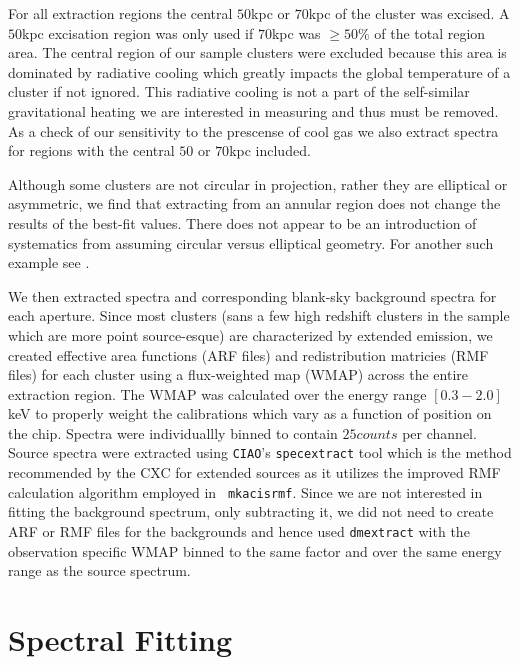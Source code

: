 \documentclass[12pt, preprint]{aastex}
\begin{document}
For all extraction regions the central $50$kpc or
$70$kpc of the cluster was excised. A $50$kpc excisation region was only used if $70$kpc was
$\geq 50\%$ of the total region area. The central region of our sample
clusters were excluded because this area is dominated by radiative cooling which
greatly impacts the global temperature of a cluster if not
ignored. This radiative cooling is not a part of the self-similar
gravitational heating we are interested in measuring and thus must be
removed. As a check of our sensitivity to the prescense of cool gas
we also extract spectra for regions with the central $50$ or $70$kpc included.

Although some clusters are not circular in projection, rather they are
elliptical or asymmetric, we find that extracting from an annular region does not
change the results of the best-fit values. There does not appear to be
an introduction of systematics from assuming circular versus
elliptical geometry. For another such example see \cite{2005MNRAS.359.1481B}.

We then extracted spectra and corresponding blank-sky background
spectra for each aperture. Since most clusters (sans a few high redshift
clusters in the sample which are more point source-esque) are
characterized by extended emission, we created effective area functions
(ARF files) and redistribution matricies (RMF files) for each cluster
using a flux-weighted map (WMAP) across the entire extraction region. The
WMAP was calculated over the energy range $[0.3-2.0]$keV to properly
weight the calibrations which vary as a function of position on the
chip. Spectra were individuallly binned to contain $25 counts$ per channel. Source
spectra were extracted using {\tt CIAO}'s {\tt specextract} tool which
is the method recommended by the CXC for extended sources as it
utilizes the improved RMF calculation algorithm employed in {\tt
mkacisrmf}. Since we are not interested in fitting the
background spectrum, only subtracting it, we did not need to create ARF
or RMF files for the backgrounds and hence used {\tt dmextract} with
the observation specific WMAP binned to the same factor and over the
same energy range as the source spectrum.

\section{Spectral Fitting} \label{sec:fitting}
\end{document}
